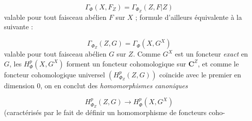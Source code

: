 \[
\Gamma_\Phi(X,F_Z)=\Gamma_{\Phi_Z}(Z,F\vert Z)
\]
valable pour tout faisceau abélien $F$ sur $X$ ; formule d'ailleurs équivalente
à la suivante :

\[
\Gamma_{\Phi_Z}(Z,G)=\Gamma_\Phi(X,G^X)
\]
valable pour tout faisceau abélien $G$ sur $Z$.
Comme $G^X$ est un foncteur \textit{exact} en $G$, les $H^p_\Phi(X,G^X)$
forment un foncteur cohomologique sur $\mathbf C^Z$, et comme le foncteur cohomologique
universel $(H^p_{\Phi_Z}(Z,G))$ coïncide avec le premier en dimension 0, on en
conclut des \textit{homomorphismes canoniques}

\[
H^p_{\Phi_Z}(Z,G)\to H^p_\Phi(X,G^X)
\]
(caractérisés par le fait de définir un homomorphisme de foncteurs coho-

